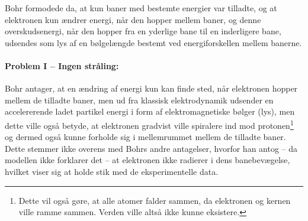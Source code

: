 Bohr formodede da, at kun baner med bestemte energier var tilladte, og at elektronen kun ændrer energi, når den hopper mellem baner, og denne overskudsenergi, når den hopper fra en yderlige bane til en inderligere bane, udsendes som lys af en bølgelængde bestemt ved energiforskellen mellem banerne.

\paragraph{Problem I -- Ingen stråling:} Bohr antager, at en ændring af energi kun kan finde sted, når elektronen hopper mellem de tilladte baner, men ud fra klassisk elektrodynamik udsender en accelererende ladet partikel energi i form af elektromagnetiske bølger (lys), men dette ville også betyde, at elektronen gradvist ville spiralere ind mod protonen\footnote{Dette vil også gøre, at alle atomer falder sammen, da elektronen og kernen ville ramme sammen. Verden ville altså ikke kunne eksistere.} og dermed også kunne forholde sig i mellemrummet mellem de tilladte baner. Dette stemmer ikke overens med Bohrs andre antagelser, hvorfor han antog -- da modellen ikke forklarer det -- at elektronen ikke radierer i dens banebevægelse, hvilket viser sig at holde stik med de eksperimentelle data.

